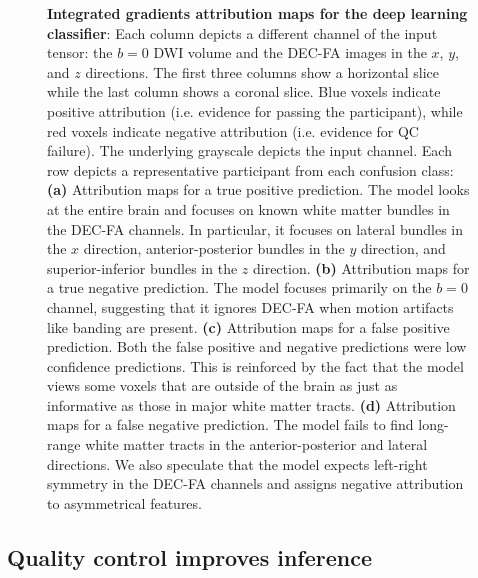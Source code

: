 \documentclass[9pt,lineno]{elife}
\begin{document}
\begin{figure}[tbp]
\begin{fullwidth}
\begin{subfigure}{\dimexpr\linewidth-3.5em\relax}
    \end{subfigure}
    \caption{%
        {\bf Integrated gradients attribution maps for the deep learning classifier}:
        Each column depicts a different channel of the input tensor: the $b=0$
        DWI volume and the DEC-FA images in the $x$, $y$, and $z$ directions.
        The first three columns show a horizontal slice while the last column
        shows a coronal slice. Blue voxels indicate positive attribution (i.e.
        evidence for passing the participant), while red voxels indicate negative
        attribution (i.e. evidence for QC failure). The underlying grayscale
        depicts the input channel. Each row depicts a representative participant
        from each confusion class:
        \textbf{(a)} Attribution maps for a true positive prediction. The model
        looks at the entire brain and focuses on known white matter bundles in
        the DEC-FA channels. In particular, it focuses on lateral bundles in the
        $x$ direction, anterior-posterior bundles in the $y$ direction, and
        superior-inferior bundles in the $z$ direction.
        \textbf{(b)} Attribution maps for a true negative prediction. The model
        focuses primarily on the $b=0$ channel, suggesting that it ignores
        DEC-FA when motion artifacts like banding are present.
        \textbf{(c)} Attribution maps for a false positive prediction. Both the
        false positive and negative predictions were low confidence predictions.
        This is reinforced by the fact that the model views some voxels that are
        outside of the brain as just as informative as those in major white
        matter tracts.
        \textbf{(d)} Attribution maps for a false negative prediction. The model
        fails to find long-range white matter tracts in the anterior-posterior
        and lateral directions. We also speculate that the model expects
        left-right symmetry in the DEC-FA channels and assigns negative
        attribution to asymmetrical features. }
    \label{fig:ig}
\end{fullwidth}
\end{figure}

\subsection{Quality control improves inference}
\end{document}
